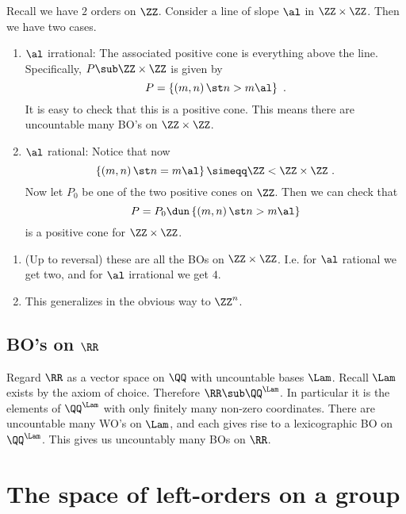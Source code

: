 Recall we have $2$ orders on $\ZZ$.
Consider a line of slope $\al$ in $\ZZ\times \ZZ$.
Then we have two cases.
\begin{enumerate}
\item $\al$ irrational: The associated positive cone is everything above the line.
Specifically, $P\sub \ZZ\times \ZZ$ is given by
\begin{equation}
P = \left\{\left(m,n\right) \st n > m\al\right\} \ .
\end{equation}
It is easy to check that this is a positive cone. 
This means there are uncountable many BO's on $\ZZ\times \ZZ$.

\item $\al$ rational: Notice that now
\begin{equation}
\left\{\left(m,n\right) \st n = m\al\right\} \simeqq \ZZ < \ZZ\times \ZZ
\ .
\end{equation}
Now let $P_0$ be one of the two positive cones on $\ZZ$. Then we can check that 
\begin{equation*}
P =P_0\dun \left\{
\left(m,n\right) \st n > m\al
\right\}
\end{equation*}
is a positive cone for $\ZZ \times \ZZ$.
\end{enumerate}

\begin{rmk}
\begin{enumerate}
\item (Up to reversal) these are all the BOs on $\ZZ \times \ZZ$. I.e. for $\al$ rational
we get two, and for $\al$ irrational we get $4$.
\item This generalizes in the obvious way to $\ZZ^n$.
\end{enumerate}
\end{rmk}

\section{BO's on \texorpdfstring{$\RR$}{the real line}}

Regard $\RR$ as a vector space on $\QQ$ with uncountable bases $\Lam$.
Recall $\Lam$ exists by the axiom of choice.
Therefore $\RR\sub \QQ^\Lam$. 
In particular it is the elements of $\QQ^\Lam$ with only finitely many non-zero
coordinates.
There are uncountable many WO's on $\Lam$, 
and each gives rise to a lexicographic BO on $\QQ^\Lam$.
This gives us uncountably many BOs on $\RR$.

\chapter{The space of left-orders on a group}

